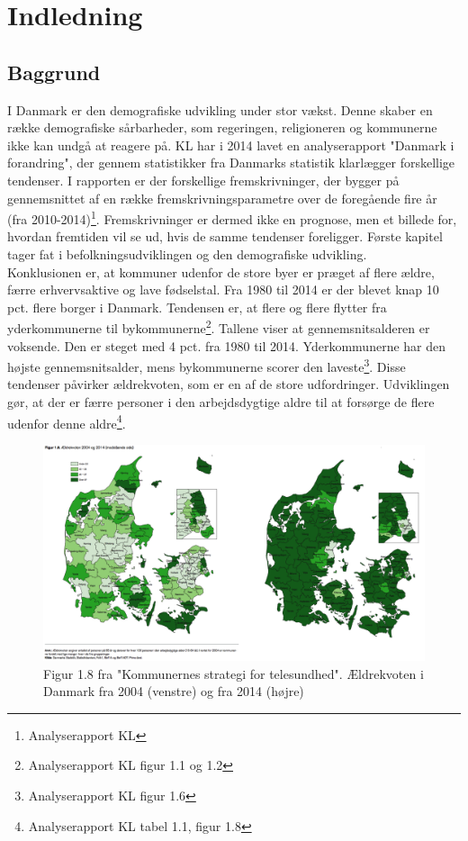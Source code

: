 \chapter{Indledning}

\section{Baggrund}
I Danmark er den demografiske udvikling under stor vækst. Denne skaber en række demografiske sårbarheder, som regeringen, religioneren og kommunerne ikke kan undgå at reagere på. KL har i 2014 lavet en analyserapport "Danmark i forandring", der gennem statistikker fra Danmarks statistik klarlægger forskellige tendenser. I rapporten er der forskellige fremskrivninger, der bygger på gennemsnittet af en række fremskrivningsparametre over de foregående fire år (fra 2010-2014)\footnote{Analyserapport KL}. Fremskrivninger er dermed ikke en prognose, men et billede for, hvordan fremtiden vil se ud, hvis de samme tendenser foreligger. Første kapitel tager fat i befolkningsudviklingen og den demografiske udvikling. \\
Konklusionen er, at kommuner udenfor de store byer er præget af flere ældre, færre erhvervsaktive og lave fødselstal. Fra 1980 til 2014 er der blevet knap 10 pct. flere borger i Danmark. Tendensen er, at flere og flere flytter fra yderkommunerne til bykommunerne\footnote{Analyserapport KL figur 1.1 og 1.2 }. Tallene viser at gennemsnitsalderen er voksende. Den er steget med 4 pct. fra 1980 til 2014. Yderkommunerne har den højste gennemsnitsalder, mens bykommunerne scorer den laveste\footnote{Analyserapport KL figur 1.6}. Disse tendenser påvirker ældrekvoten, som er en af de store udfordringer. Udviklingen gør, at der er færre personer i den arbejdsdygtige aldre til at forsørge de flere udenfor denne aldre\footnote{Analyserapport KL tabel 1.1, figur 1.8}.

\begin{figure}[H]
\centering
\includegraphics[width=1\textwidth]{Figurer/Snip20160428_14}
\caption{Figur 1.8 fra "Kommunernes strategi for telesundhed". Ældrekvoten i Danmark fra 2004 (venstre) og fra 2014 (højre)}
	
\end{figure}

